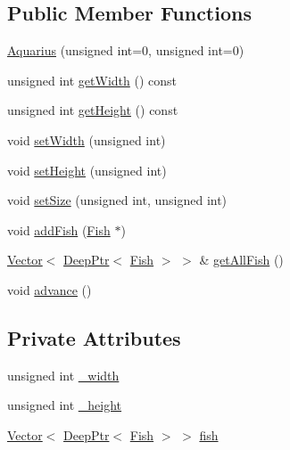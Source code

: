 \subsection*{Public Member Functions}
\begin{DoxyCompactItemize}
\item 
\hyperlink{classAquarius_a7c8e40855d95468d8264ba0a1558d481_a7c8e40855d95468d8264ba0a1558d481}{Aquarius} (unsigned int=0, unsigned int=0)
\item 
unsigned int \hyperlink{classAquarius_a9cd1a0002fa16ca6f51ad4b00717c581_a9cd1a0002fa16ca6f51ad4b00717c581}{get\+Width} () const
\item 
unsigned int \hyperlink{classAquarius_a9f863c5458b9f5b21b6d0257b44ba433_a9f863c5458b9f5b21b6d0257b44ba433}{get\+Height} () const
\item 
void \hyperlink{classAquarius_a129d55d1a9e34354d1173f77f35f5ac8_a129d55d1a9e34354d1173f77f35f5ac8}{set\+Width} (unsigned int)
\item 
void \hyperlink{classAquarius_a64e999656f70edcfc6cedd4231638eb5_a64e999656f70edcfc6cedd4231638eb5}{set\+Height} (unsigned int)
\item 
void \hyperlink{classAquarius_ac357e8f719c2089527d2c493ca6aa1fc_ac357e8f719c2089527d2c493ca6aa1fc}{set\+Size} (unsigned int, unsigned int)
\item 
void \hyperlink{classAquarius_ab1d6d5d8f64be1cb8a0b9d0f0edea174_ab1d6d5d8f64be1cb8a0b9d0f0edea174}{add\+Fish} (\hyperlink{classFish}{Fish} $\ast$)
\item 
\hyperlink{classVector}{Vector}$<$ \hyperlink{classDeepPtr}{Deep\+Ptr}$<$ \hyperlink{classFish}{Fish} $>$ $>$ \& \hyperlink{classAquarius_a1bef6f16e9267d43d09d890783af1a09_a1bef6f16e9267d43d09d890783af1a09}{get\+All\+Fish} ()
\item 
void \hyperlink{classAquarius_a9fb56287ead8d2ac5b64098b95557bdd_a9fb56287ead8d2ac5b64098b95557bdd}{advance} ()
\end{DoxyCompactItemize}
\subsection*{Private Attributes}
\begin{DoxyCompactItemize}
\item 
unsigned int \hyperlink{classAquarius_a0ca48db776444e3513c0927127228dad_a0ca48db776444e3513c0927127228dad}{\+\_\+width}
\item 
unsigned int \hyperlink{classAquarius_a3b82543e9c69b03b53c76fbce4f945ea_a3b82543e9c69b03b53c76fbce4f945ea}{\+\_\+height}
\item 
\hyperlink{classVector}{Vector}$<$ \hyperlink{classDeepPtr}{Deep\+Ptr}$<$ \hyperlink{classFish}{Fish} $>$ $>$ \hyperlink{classAquarius_ad4c9e6cdbe69fbdc96cf8be68d1b9e82_ad4c9e6cdbe69fbdc96cf8be68d1b9e82}{fish}
\end{DoxyCompactItemize}


